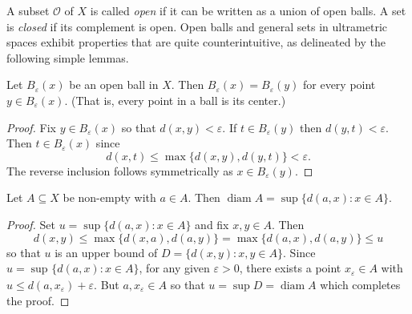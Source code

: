 A subset \( \mathcal{O}  \) of \( X \) is called \emph{open} if it can be written as a union of open balls. A set is \emph{closed} if its complement is open. Open balls and general sets in ultrametric spaces exhibit properties that are quite counterintuitive, as delineated by the following simple lemmas.
\begin{lemma}
Let \( B_{\varepsilon } (x) \) be an open ball in \( X \). Then \( B_{\varepsilon } (x) = B_{\varepsilon } (y) \) for every point \( y \in B_{\varepsilon } (x) \). (That is, every point in a ball is its center.)
\end{lemma}
\begin{proof}
Fix \( y \in B_{\varepsilon } (x) \) so that \( d(x,y) < \varepsilon  \). If \( t \in B_{\varepsilon } (y) \) then \( d(y,t) < \varepsilon  \). Then \( t \in B_{\varepsilon } (x) \) since \[ d(x, t) \leq \max \{ d(x,y), d(y,t) \} < \varepsilon . \] The reverse inclusion follows symmetrically as \( x \in B_{\varepsilon } (y) \).
\end{proof}
\begin{lemma}
Let \( A \subseteq X \) be non-empty with \( a \in A \). Then \( \operatorname{diam} A = \sup \{ d(a, x) : x \in A \}   \).
\end{lemma}
\begin{proof}
	Set \( u = \sup \{ d(a,x) : x \in A \}  \) and fix \( x,y \in A \). Then \[ d(x,y) \leq \max \{ d(x, a) , d(a, y) \} = \max \{ d(a,x), d(a,y) \} \leq u  \] so that \( u \) is an upper bound of \( D = \{ d(x,y) : x,y \in A \}  \). Since \( u = \sup_{} \{ d(a,x) : x \in A \}  \), for any given \( \varepsilon > 0 \), there exists a point \( x_{\varepsilon } \in A \) with \( u \leq d(a, x_{\varepsilon }) + \varepsilon   \). But \( a, x_{\varepsilon } \in A \) so that \( u = \sup D = \operatorname{diam} A \) which completes the proof.
\end{proof}

